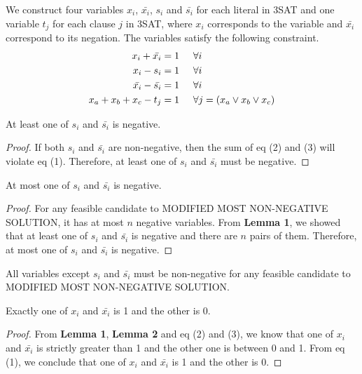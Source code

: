 We construct four variables $x_i$, $\bar{x_i}$, $s_i$ and $\bar{s_i}$ for each literal in 3SAT and one variable $t_j$ for each clause $j$ in 3SAT, where $x_i$ corresponds to the variable and $\bar{x_i}$ correspond to its negation. The variables satisfy the following constraint. 
\begin{align}
x_i + \bar{x_i} &= 1 \hspace{5mm} \forall i\\
x_i - s_i &= 1 \hspace{5mm} \forall i\\
\bar{x_i} - \bar{s_i} &= 1\hspace{5mm} \forall i\\
x_a + x_b + x_c - t_j &= 1 \hspace{5mm} \forall j = (x_a\lor x_b \lor x_c)
\end{align}
\begin{lemma} At least one of $s_i$ and $\bar{s_i}$ is negative. \end{lemma}
\begin{proof} If both $s_i$ and $\bar{s_i}$ are non-negative, then the sum of eq (2) and (3) will violate eq (1). Therefore, at least one of $s_i$ and $\bar{s_i}$ must be negative.\end{proof}
\begin{lemma} At most one of $s_i$ and $\bar{s_i}$ is negative.\end{lemma}
\begin{proof} For any feasible candidate to MODIFIED MOST NON-NEGATIVE SOLUTION, it has at most $n$ negative variables. From \textbf{Lemma 1}, we showed that at least one of $s_i$ and $\bar{s_i}$ is negative and there are $n$ pairs of them. Therefore, at most one of $s_i$ and $\bar{s_i}$ is negative. \end{proof}
\begin{corollary} All variables except $s_i$ and $\bar{s_i}$ must be non-negative for any feasible candidate to MODIFIED MOST NON-NEGATIVE SOLUTION.
\end{corollary}
\begin{lemma}Exactly one of $x_i$ and $\bar{x_i}$ is 1 and the other is 0.\end{lemma}
\begin{proof} From \textbf{Lemma 1},  \textbf{Lemma 2} and eq (2) and (3), we know that one of $x_i$ and $\bar{x_i}$ is strictly greater than 1 and the other one is between 0 and 1. From eq (1), we conclude that one of $x_i$ and $\bar{x_i}$ is 1 and the other is 0.\end{proof}
